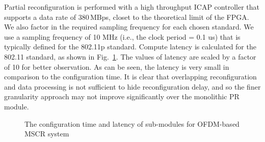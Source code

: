 Partial reconfiguration is performed with a high throughput ICAP controller that supports a data rate of 380\,MBps, closet to the theoretical limit of the FPGA.
We also factor in the required sampling frequency for each chosen standard.
We use a sampling frequency of 10 MHz (i.e., the clock period = 0.1 us) that is typically defined for the 802.11p standard. 
Compute latency is calculated for the 802.11 standard, as shown in Fig.~\ref{fig:CfgLat}.
The values of latency are scaled by a factor of 10 for better observation. As can be seen, the latency is very small in comparison to the configuration time.
It is clear that overlapping reconfiguration and data processing is not sufficient to hide reconfiguration delay, and so the finer granularity approach may not improve significantly over the monolithic PR module.
\begin{figure}
\centering
{}
\caption{The configuration time and latency of sub-modules for OFDM-based MSCR system}
\label{fig:CfgLat}
\end{figure}


